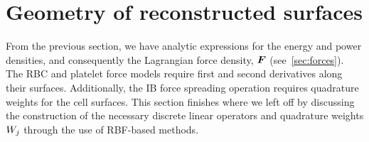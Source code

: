 



\section{Geometry of reconstructed surfaces}\label{sec:rbfs}

From the previous section, we have analytic expressions for the energy and power
densities, and consequently the Lagrangian force density, $\boldsymbol{F}$ (see~\ref{sec:forces}).
The RBC and platelet force models require first and second derivatives along their
surfaces.  Additionally, the IB force spreading operation requires quadrature weights for
the cell surfaces. This section finishes where we left off by discussing the construction
of the necessary discrete linear operators and quadrature weights $\weight[j]$ through
the use of RBF-based methods.




